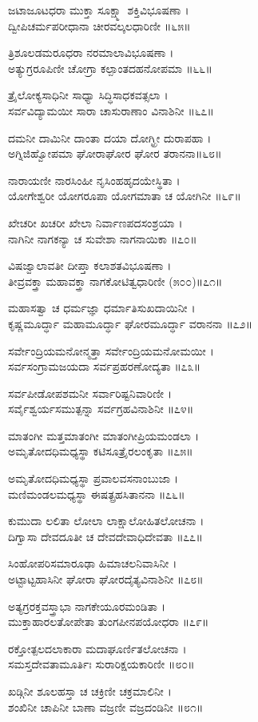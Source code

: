 ಜಟಾಜೂಟಧರಾ ಮುಕ್ತಾ ಸೂಕ್ಷ್ಮಾ ಶಕ್ತಿವಿಭೂಷಣಾ ।\\
ದ್ವೀಪಿಚರ್ಮಪರೀಧಾನಾ ಚೀರವಲ್ಕಲಧಾರಿಣೀ ॥೬೫॥

ತ್ರಿಶೂಲಡಮರೂಧರಾ ನರಮಾಲಾವಿಭೂಷಣಾ ।\\
ಅತ್ಯುಗ್ರರೂಪಿಣೀ ಚೋಗ್ರಾ ಕಲ್ಪಾಂತದಹನೋಪಮಾ ॥೬೬॥

ತ್ರೈಲೋಕ್ಯಸಾಧಿನೀ ಸಾಧ್ಯಾ ಸಿದ್ಧಿಸಾಧಕವತ್ಸಲಾ ।\\
ಸರ್ವವಿದ್ಯಾಮಯೀ ಸಾರಾ ಚಾಸುರಾಣಾಂ ವಿನಾಶಿನೀ ॥೬೭॥

ದಮನೀ ದಾಮಿನೀ ದಾಂತಾ ದಯಾ ದೋಗ್ಘ್ರೀ ದುರಾಪಹಾ ।\\
ಅಗ್ನಿಜಿಹ್ವೋಪಮಾ ಘೋರಾಘೋರ ಘೋರ ತರಾನನಾ॥೬೮॥

ನಾರಾಯಣೀ ನಾರಸಿಂಹೀ ನೃಸಿಂಹಹೃದಯೇಸ್ಥಿತಾ ।\\
ಯೋಗೇಶ್ವರೀ ಯೋಗರೂಪಾ ಯೋಗಮಾತಾ ಚ ಯೋಗಿನೀ ॥೬೯॥

ಖೇಚರೀ ಖಚರೀ ಖೇಲಾ ನಿರ್ವಾಣಪದಸಂಶ್ರಯಾ ।\\
ನಾಗಿನೀ ನಾಗಕನ್ಯಾ ಚ ಸುವೇಶಾ ನಾಗನಾಯಿಕಾ ॥೭೦॥

ವಿಷಜ್ವಾಲಾವತೀ ದೀಪ್ತಾ ಕಲಾಶತವಿಭೂಷಣಾ ।\\
ತೀವ್ರವಕ್ತ್ರಾ ಮಹಾವಕ್ತ್ರಾ ನಾಗಕೋಟಿತ್ವಧಾರಿಣೀ (೫೦೦)॥೭೧॥

ಮಹಾಸತ್ವಾ ಚ ಧರ್ಮಜ್ಞಾ ಧರ್ಮಾತಿಸುಖದಾಯಿನೀ ।\\
ಕೃಷ್ಣಮೂರ್ದ್ಧಾ ಮಹಾಮೂರ್ದ್ಧಾ ಘೋರಮೂರ್ದ್ಧಾ ವರಾನನಾ ॥೭೨॥

ಸರ್ವೇಂದ್ರಿಯಮನೋನ್ಮತ್ತಾ ಸರ್ವೇಂದ್ರಿಯಮನೋಮಯೀ ।\\
ಸರ್ವಸಂಗ್ರಾಮಜಯದಾ ಸರ್ವಪ್ರಹರಣೋದ್ಯತಾ ॥೭೩॥

ಸರ್ವಪೀಡೋಪಶಮನೀ ಸರ್ವಾರಿಷ್ಟನಿವಾರಿಣೀ ।\\
ಸರ್ವೈಶ್ವರ್ಯಸಮುತ್ಪನ್ನಾ ಸರ್ವಗ್ರಹವಿನಾಶಿನೀ ॥೭೪॥

ಮಾತಂಗೀ ಮತ್ತಮಾತಂಗೀ ಮಾತಂಗೀಪ್ರಿಯಮಂಡಲಾ ।\\
ಅಮೃತೋದಧಿಮಧ್ಯಸ್ಥಾ ಕಟಿಸೂತ್ರೈರಲಂಕೃತಾ ॥೭೫॥

ಅಮೃತೋದಧಿಮಧ್ಯಸ್ಥಾ ಪ್ರವಾಲವಸನಾಂಬುಜಾ ।\\
ಮಣಿಮಂಡಲಮಧ್ಯಸ್ಥಾ ಈಷತ್ಪ್ರಹಸಿತಾನನಾ ॥೭೬॥

ಕುಮುದಾ ಲಲಿತಾ ಲೋಲಾ ಲಾಕ್ಷಾಲೋಹಿತಲೋಚನಾ ।\\
ದಿಗ್ವಾಸಾ ದೇವದೂತೀ ಚ ದೇವದೇವಾಧಿದೇವತಾ ॥೭೭॥

ಸಿಂಹೋಪರಿಸಮಾರೂಢಾ ಹಿಮಾಚಲನಿವಾಸಿನೀ ।\\
ಅಟ್ಟಾಟ್ಟಹಾಸಿನೀ ಘೋರಾ ಘೋರದೈತ್ಯವಿನಾಶಿನೀ ॥೭೮॥

ಅತ್ಯಗ್ರರಕ್ತವಸ್ತ್ರಾಭಾ ನಾಗಕೇಯೂರಮಂಡಿತಾ ।\\
ಮುಕ್ತಾಹಾರಲತೋಪೇತಾ ತುಂಗಪೀನಪಯೋಧರಾ ॥೭೯॥

ರಕ್ತೋತ್ಪಲದಲಾಕಾರಾ ಮದಾಘೂರ್ಣಿತಲೋಚನಾ ।\\
ಸಮಸ್ತದೇವತಾಮೂರ್ತಿಃ ಸುರಾರಿಕ್ಷಯಕಾರಿಣೀ ॥೮೦॥

ಖಡ್ಗಿನೀ ಶೂಲಹಸ್ತಾ ಚ ಚಕ್ರಿಣೀ ಚಕ್ರಮಾಲಿನೀ ।\\
ಶಂಖಿನೀ ಚಾಪಿನೀ ಬಾಣಾ ವಜ್ರಣೀ ವಜ್ರದಂಡಿನೀ ॥೮೧॥

